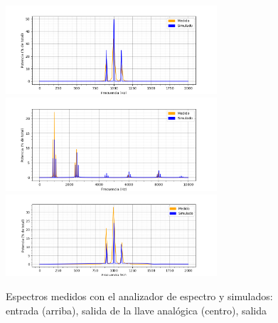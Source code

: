 \documentclass[a4paper]{article}
\begin{document}
\begin{figure}[htp]
	\centering
	\includegraphics[width=0.7\textwidth]{ej7_meds/7_in.png}
	\includegraphics[width=0.7\textwidth]{ej7_meds/7_llave.png}
	\includegraphics[width=0.7\textwidth]{ej7_meds/7_out.png}
	\caption{Espectros medidos con el analizador de espectro y simulados: entrada (arriba), salida de la llave anal\'ogica (centro), salida }
	\label{fig:ej7_out}
\end{figure}
\end{document}
